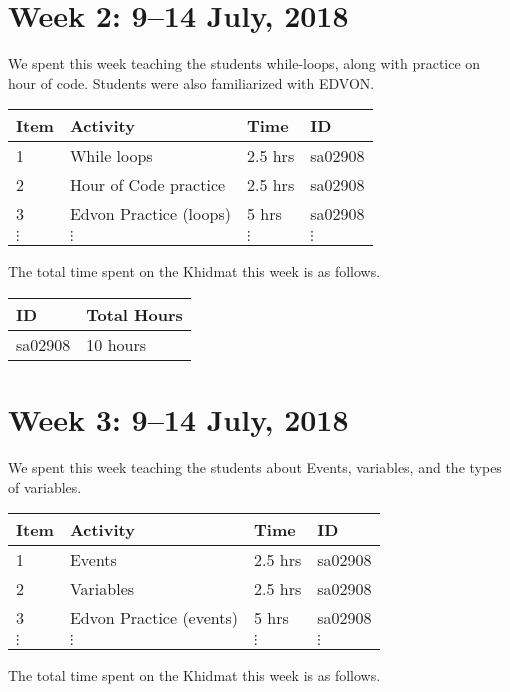 \documentclass{article}
\begin{document}

\newpage 
\section*{Week 2: 9--14 July, 2018}

We spent this week teaching the students while-loops, along with practice on hour of code. Students were also familiarized with EDVON.

\begin{tabular}{|l|l|l|l|}
  \hline
  Item  & Activity & Time & ID \\\hline\hline
  1 & While loops & 2.5 hrs & sa02908 \\\hline
  2 & Hour of Code practice & 2.5 hrs & sa02908 \\\hline
  3 & Edvon Practice (loops) & 5 hrs & sa02908 \\\hline
  $\vdots$ & $\vdots$ & $\vdots$ & $\vdots$ \\\hline
\end{tabular}

The total time spent on the Khidmat this week is as follows.

\begin{tabular}{|l|l|}
  \hline
  ID & Total Hours\\\hline\hline
  sa02908 & 10 hours\\\hline
\end{tabular}


\newpage 
\section*{Week 3: 9--14 July, 2018}

We spent this week teaching the students about Events, variables, and the types of variables.

\begin{tabular}{|l|l|l|l|}
  \hline
  Item  & Activity & Time & ID \\\hline\hline
  1 & Events & 2.5 hrs & sa02908 \\\hline
  2 & Variables & 2.5 hrs & sa02908 \\\hline
  3 & Edvon Practice (events) & 5 hrs & sa02908 \\\hline
  $\vdots$ & $\vdots$ & $\vdots$ & $\vdots$ \\\hline
\end{tabular}

The total time spent on the Khidmat this week is as follows.
\end{document}
